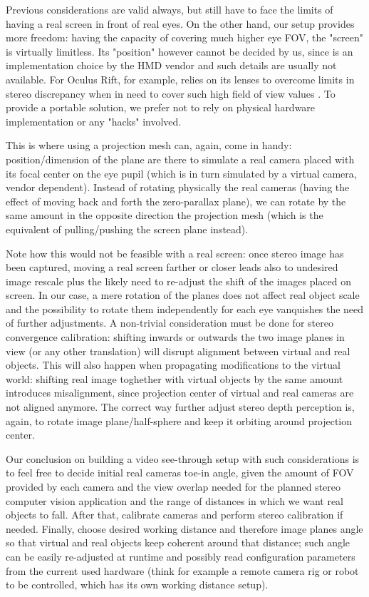 Previous considerations are valid always, but still have to face the limits of having a real screen in front of real eyes. On the other hand, our setup provides more freedom: having the capacity of covering much higher eye FOV, the "screen" is virtually limitless. Its "position" however cannot be decided by us, since is an implementation choice by the HMD vendor and such details are usually not available. For Oculus Rift, for example, relies on its lenses to overcome limits in stereo discrepancy when in need to cover such high field of view values \cite{link_oculus_limits}. To provide a portable solution, we prefer not to rely on physical hardware implementation or any "hacks" involved.

This is where using a projection mesh can, again, come in handy: position/dimension of the plane are there to simulate a real camera placed with its focal center on the eye pupil (which is in turn simulated by a virtual camera, vendor dependent). Instead of rotating physically the real cameras (having the effect of moving back and forth the zero-parallax plane), we can rotate by the same amount in the opposite direction the projection mesh (which is the equivalent of pulling/pushing the screen plane instead).

Note how this would not be feasible with a real screen: once stereo image has been captured, moving a real screen farther or closer leads also to undesired image rescale plus the likely need to re-adjust the shift of the images placed on screen. In our case, a mere rotation of the planes does not affect real object scale and the possibility to rotate them independently for each eye vanquishes the need of further adjustments. A non-trivial consideration must be done for stereo convergence calibration: shifting inwards or outwards the two image planes in view (or any other translation) will disrupt alignment between virtual and real objects. This will also happen when propagating modifications to the virtual world: shifting real image toghether with virtual objects by the same amount introduces misalignment, since projection center of virtual and real cameras are not aligned anymore. The correct way further adjust stereo depth perception is, again, to rotate image plane/half-sphere and keep it orbiting around projection center.

Our conclusion on building a video see-through setup with such considerations is to feel free to decide initial real cameras toe-in angle, given the amount of FOV provided by each camera and the view overlap needed for the planned stereo computer vision application and the range of distances in which we want real objects to fall. After that, calibrate cameras and perform stereo calibration if needed. Finally, choose desired working distance and therefore image planes angle so that virtual and real objects keep coherent around that distance; such angle can be easily re-adjusted at runtime and possibly read configuration parameters from the current used hardware (think for example a remote camera rig or robot to be controlled, which has its own working distance setup). 

